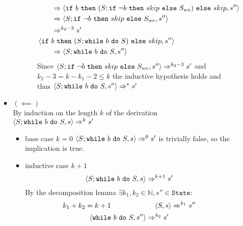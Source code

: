 \begin{exercise}
\begin{enumerate}
\begin{itemize}
\begin{itemize}
\begin{itemize}
\begin{itemize}
\begin{align*}
                                            \\&\qquad\Rightarrow \left<\texttt{if}\ b\ \texttt{then}\ (S; \texttt{if}\ \neg b\ \texttt{then}\ skip\ \texttt{else}\ S_{we})\ \texttt{else}\ skip, s''\right>
                                            \\&\qquad\Rightarrow \left<S; \texttt{if}\ \neg b\ \texttt{then}\ skip\ \texttt{else}\ S_{we}, s''\right>
                                            \\&\qquad\Rightarrow^{k_2 - 3} s'
                                            \\
                                            &\left<\texttt{if}\ b\ \texttt{then}\ (S; \texttt{while}\ b\ \texttt{do}\ S)\ \texttt{else}\ skip, s''\right>
                                            \\&\qquad\Rightarrow \left<S; \texttt{while}\ b\ \texttt{do}\ S, s''\right>
                                        \end{align*}
                                        Since $\left<S; \texttt{if}\ \neg b\ \texttt{then}\ skip\ \texttt{else}\ S_{we}, s''\right> \Rightarrow^{k_2 - 3} s'$ and $k_2 - 3 = k - k_1 - 2 \leq k$ the inductive hypothesis holds and thus $\left<S; \texttt{while}\ b\ \texttt{do}\ S, s''\right> \Rightarrow^* s'$
                                    \end{itemize}
                            \end{itemize}
                        \item $(\impliedby)$ \vspace{0.2cm} \\
                            By induction on the length $k$ of the derivation $\left<S; \texttt{while}\ b\ \texttt{do}\ S, s\right> \Rightarrow^k s'$
                            \begin{itemize}
                                \item base case $k=0$
                                    $\left<S; \texttt{while}\ b\ \texttt{do}\ S, s\right> \Rightarrow^0 s'$ is trivially false, so the implication is true.
                                \item inductive case $k+1$ \vspace*{-0.3cm}
                                    \[ \left<S; \texttt{while}\ b\ \texttt{do}\ S, s\right> \Rightarrow^{k+1} s' \]
                                    By the decomposition lemma $\exists k_1, k_2 \in \mathbb{N}, s'' \in \texttt{State} :$
                                    \begin{gather*}
                                        k_1 + k_2 = k + 1 \qquad\qquad\qquad \left<S, s\right> \Rightarrow^{k_1} s'' \\
                                        \left<\texttt{while}\ b\ \texttt{do}\ S, s''\right> \Rightarrow^{k_2} s'
                                    \end{gather*}

\end{itemize}
\end{itemize}
\end{itemize}
\end{enumerate}
\end{exercise}

